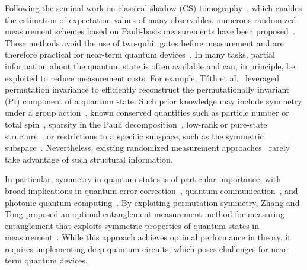 \documentclass[prl,aps,twocolumn,notitlepage,superscriptaddress,showpacs,nofootinbib]{revtex4-2}
\newcommand{\red}[1]{{\color{red} #1}}
\begin{document}
Following the seminal work on classical shadow (CS) tomography~\cite{huang2020predicting}, 
which enables the estimation of expectation values of many observables, 
numerous randomized measurement schemes based on Pauli-basis measurements have been proposed~\cite{Huang2021Efficient,hadfield2022measurements,wu2023overlapped,Shlosberg2023Adaptive,zhang2023composite,gresch2025guaranteed}. 
These methods avoid the use of two-qubit gates before measurement and are therefore practical for near-term quantum devices~\cite{huang2020predicting}. 
In many tasks, partial information about the quantum state is often available and can, in principle, be exploited to reduce measurement costs. \red{For example, Tóth et al.~\cite{toth2010permuted} leveraged permutation invariance to efficiently reconstruct the permutationally invariant (PI) component of a quantum state.}
Such prior knowledge may include symmetry under a group action~\cite{toth2010permuted,elben2020mixed}, 
known conserved quantities such as particle number or total spin~\cite{bravyi2017tapering,setia2020reducing}, 
sparsity in the Pauli decomposition~\cite{peruzzo2014variational}, 
low-rank or pure-state structure~\cite{gross2010quantum}, 
or restrictions to a specific subspace, such as the symmetric subspace~\cite{stockton2003characterizing,moroder2012permutationally}. 
Nevertheless, existing randomized measurement approaches~\cite{huang2020predicting,Huang2021Efficient,hadfield2022measurements,wu2023overlapped,Shlosberg2023Adaptive,zhang2023composite,gresch2025guaranteed} 
rarely take advantage of such structural information.

In particular, symmetry in quantum states is of particular importance, with broad implications in quantum error correction~\cite{ouyang2014permutation,ouyang2017permutation}, quantum communication~\cite{dur2000three}, and photonic quantum computing~\cite{tichy2015sampling}. 
By exploiting permutation symmetry, 
Zhang and Tong proposed an optimal entanglement measurement method for measuring entanglement that exploits symmetric properties of quantum states in measurement~\cite{zhang2024inferring}. While this approach achieves optimal performance in theory, it requires implementing deep quantum circuits, which poses challenges for near-term quantum devices.
\end{document}
